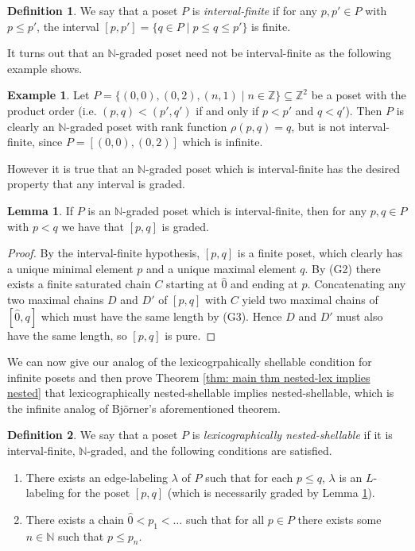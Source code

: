 \documentclass[oneside,11pt,reqno]{amsart}
\newcommand{\zz}{\ensuremath{\mathbb{Z}}}
\newcommand{\nn}{\ensuremath{\mathbb{N}}}
\theoremstyle{definition}
\newtheorem{definition}{Definition}
\newtheorem{example}{Example}
\newtheorem{proof techniques}{Proof Techniques}
\newtheorem{lemma}{Lemma}
\begin{document}
\begin{definition} 
We say that a poset $P$ is \emph{interval-finite} if for any $p , p' \in P$ with $p \leq p'$, the interval $[p , p'] = \{ q \in P \mid p \leq q \leq p' \}$ is finite.
\end{definition}

It turns out that an $\nn$-graded poset need not be interval-finite as the following example shows.  

\begin{example}
   Let $P = \{ (0 , 0), (0 , 2) , (n , 1) \mid n \in \zz \} \subseteq \zz^2$ be a poset with the product order (i.e. $(p , q) < (p' , q')$ if and only if $p < p'$ and $q < q'$). Then $P$ is clearly an $\nn$-graded poset with rank function $\rho(p , q) = q$, but is not interval-finite, since $P = [(0 , 0) , (0 , 2)]$ which is infinite. 
\end{example}

However it is true that an $\nn$-graded poset which is interval-finite has the desired property that any interval is graded. 

\begin{lemma}\label{lem: N-graded plus interval-finite means locally graded}
    If $P$ is an $\nn$-graded poset which is interval-finite, then for any $p, q \in P$ with $p < q$ we have that $[p , q]$ is graded.
\end{lemma}

\begin{proof}
By the interval-finite hypothesis, $[p , q]$ is a finite poset, which clearly has a unique minimal element $p$ and a unique maximal element $q$. By (G2) there exists a finite saturated chain $C$ starting at $\hat{0}$ and ending at $p$. Concatenating any two maximal chains $D$ and $D'$ of $[p , q]$ with $C$ yield two maximal chains of $[\hat{0} , q]$ which must have the same length by (G3). Hence $D$ and $D'$ must also have the same length, so $[p , q]$ is pure.
\end{proof}

We can now give our analog of the lexicogrpahically shellable condition for infinite posets and then prove Theorem \ref{thm: main thm nested-lex implies nested} that lexicographically nested-shellable implies nested-shellable, which is the infinite analog of Bj\"{o}rner's aforementioned theorem.  

\begin{definition}
    We say that a poset $P$ is \emph{lexicographically nested-shellable} if it is interval-finite, $\nn$-graded, and the following conditions are satisfied. 
    
    \begin{enumerate}
        \item[(LNS1)] There exists an edge-labeling $\lambda$ of $P$ such that for each $p \leq q$, $\lambda$ is an $L$-labeling for the poset $[p , q]$ (which is necessarily graded by Lemma \ref{lem: N-graded plus interval-finite means locally graded}). 
        \item[(LNS2)] There exists a chain $\hat{0} < p_1 < \ldots$ such that for all $p \in P$ there exists some $n \in \nn$ such that $p \leq p_n$. 
    \end{enumerate} 
\end{definition}
\end{document}
